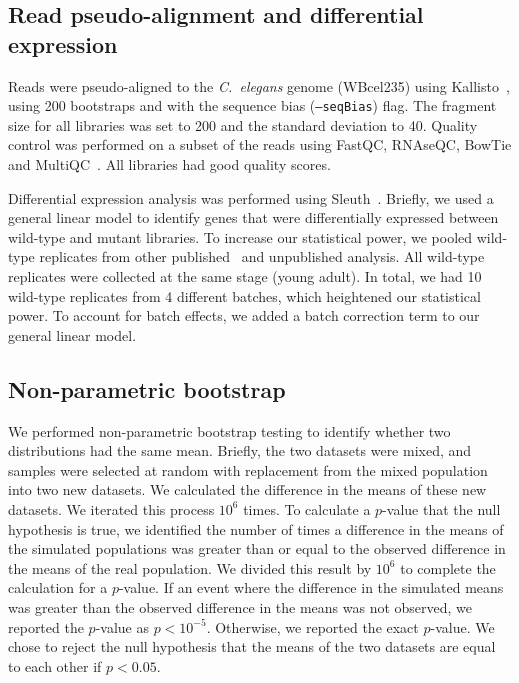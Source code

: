 \documentclass[10pt, twocolumn]{article}
\newcommand{\cel}{\emph{C.~elegans}}
\begin{document}
\subsection*{Read pseudo-alignment and differential expression}
Reads were pseudo-aligned to the \cel{} genome (WBcel235) using
Kallisto~\cite{Bray2016}, using 200 bootstraps and with the sequence bias
(\texttt{--seqBias}) flag. The fragment size for all libraries was set to 200
and the standard deviation to 40. Quality control was performed on a subset of
the reads using FastQC, RNAseQC, BowTie and
MultiQC~\cite{Andrews2010,Deluca2012,Langmead2009,Ewels2016}. All libraries had
good quality scores.

Differential expression analysis was performed using
Sleuth~\cite{Pimentel2016a}. Briefly, we used a general linear model to identify
genes that were differentially expressed between wild-type and mutant libraries.
To increase our statistical power, we pooled wild-type replicates from other
published~\cite{} and unpublished analysis. All wild-type replicates were
collected at the same stage (young adult). In total, we had 10 wild-type
replicates from 4 different batches, which heightened our statistical
power. To account for batch effects, we added a batch correction term to our
general linear model.

\subsection*{Non-parametric bootstrap}
We performed non-parametric bootstrap testing to identify whether two
distributions had the same mean. Briefly, the two datasets were mixed, and
samples were selected at random with replacement from the mixed population into
two new datasets. We calculated the difference in the means of these new
datasets. We iterated this process $10^6$ times. To calculate a $p$-value that the
null hypothesis is true, we identified the number of times a difference in the
means of the simulated populations was greater than or equal to the observed
difference in the means of the real population. We divided this result by $10^6$
to complete the calculation for a $p$-value. If an event where the difference in
the simulated means was greater than the observed difference in the means was
not observed, we reported the $p$-value as $p<10^{-5}$. Otherwise, we reported the
exact $p$-value. We chose to reject the null hypothesis that the means of the two
datasets are equal to each other if $p < 0.05$.
\end{document}

